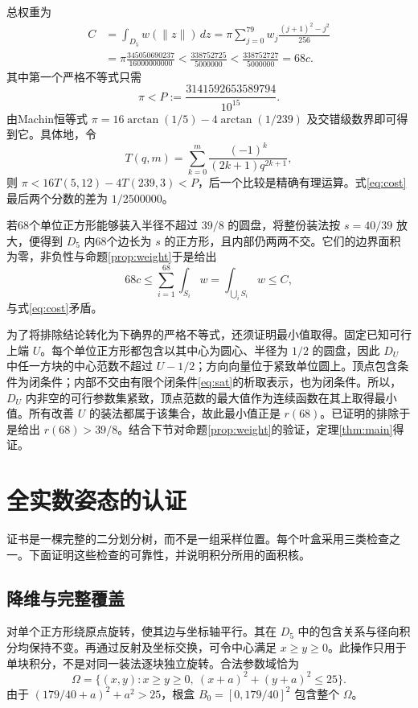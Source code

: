 \documentclass[11pt]{article}
\begin{document}
\FloatBarrier
{}
总权重为
\begin{equation}\label{eq:cost}
\begin{split}
C&=\int_{D_5}w(\|z\|)\,dz
 =\pi\sum_{j=0}^{79}w_j\frac{(j+1)^2-j^2}{256}\\
 &=\pi\frac{345050690237}{16000000000}
 <\frac{338752725}{5000000}
 <\frac{338752727}{5000000}=68c.
\end{split}
\end{equation}
其中第一个严格不等式只需
\[
\pi<P:=\frac{3141592653589794}{10^{15}}.
\]
由Machin恒等式
$\pi=16\arctan(1/5)-4\arctan(1/239)$ 及交错级数界即可得到它。具体地，令
\[
T(q,m)=\sum_{k=0}^{m}\frac{(-1)^k}{(2k+1)q^{2k+1}},
\]
则 $\pi<16T(5,12)-4T(239,3)<P$，后一个比较是精确有理运算。式\eqref{eq:cost}最后两个分数的差为 $1/2500000$。

若68个单位正方形能够装入半径不超过 $39/8$ 的圆盘，将整份装法按 $s=40/39$ 放大，便得到 $D_5$ 内68个边长为 $s$ 的正方形，且内部仍两两不交。它们的边界面积为零，非负性与命题\ref{prop:weight}于是给出
\[
68c\le\sum_{i=1}^{68}\int_{S_i}w
=\int_{\bigcup_i S_i}w\le C,
\]
与式\eqref{eq:cost}矛盾。

为了将排除结论转化为下确界的严格不等式，还须证明最小值取得。固定已知可行上端 $U$。每个单位正方形都包含以其中心为圆心、半径为 $1/2$ 的圆盘，因此 $D_U$ 中任一方块的中心范数不超过 $U-1/2$；方向向量位于紧致单位圆上。顶点包含条件为闭条件；内部不交由有限个闭条件\eqref{eq:sat}的析取表示，也为闭条件。所以，$D_U$ 内非空的可行参数集紧致，顶点范数的最大值作为连续函数在其上取得最小值。所有改善 $U$ 的装法都属于该集合，故此最小值正是 $r(68)$。已证明的排除于是给出 $r(68)>39/8$。结合下节对命题\ref{prop:weight}的验证，定理\ref{thm:main}得证。

\section{全实数姿态的认证}\label{sec:validation}
证书是一棵完整的二分划分树，而不是一组采样位置。每个叶盒采用三类检查之一。下面证明这些检查的可靠性，并说明积分所用的面积核。

\subsection{降维与完整覆盖}
对单个正方形绕原点旋转，使其边与坐标轴平行。其在 $D_5$ 中的包含关系与径向积分均保持不变。再通过反射及坐标交换，可令中心满足 $x\ge y\ge0$。此操作只用于单块积分，不是对同一装法逐块独立旋转。合法参数域恰为
\begin{equation}\label{eq:domain}
\Omega=\{(x,y):x\ge y\ge0,\ (x+a)^2+(y+a)^2\le25\}.
\end{equation}
由于 $(179/40+a)^2+a^2>25$，根盒 $B_0=[0,179/40]^2$ 包含整个 $\Omega$。
\end{document}
